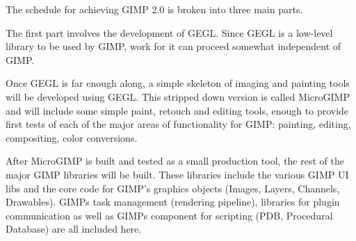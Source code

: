 
The schedule for achieving GIMP 2.0 is broken into three main parts. 

The first part involves the development of GEGL. Since GEGL is a low-level
library to be used by GIMP, work for it can proceed somewhat independent of
GIMP.    

Once GEGL is far enough along, a simple skeleton of imaging and painting tools
will be developed using GEGL. This stripped down version is called MicroGIMP
and will include some simple paint, retouch and editing tools, enough to
provide first tests of each of the major areas of functionality for GIMP:
painting, editing, compositing, color conversions. 

After MicroGIMP is built and tested as a small production tool, the rest of the
major GIMP libraries will be built. These libraries include the various GIMP UI
libs and the core code for GIMP's graphics objects (Images, Layers, Channels,
Drawables). GIMPs task management (rendering pipeline), libraries for
plugin communication  as well as GIMPs component for scripting (PDB,
Procedural Database) are all included here.  

